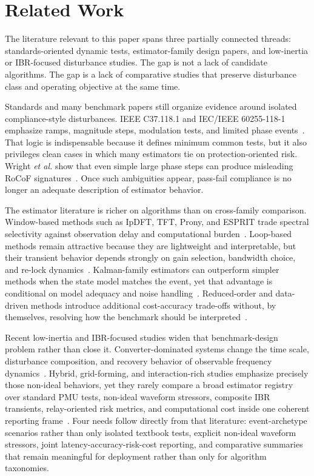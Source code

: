 \section{Related Work}
\label{sec:related_work}

The literature relevant to this paper spans three partially connected threads: standards-oriented dynamic tests, estimator-family design papers, and low-inertia or IBR-focused disturbance studies. The gap is not a lack of candidate algorithms. The gap is a lack of comparative studies that preserve disturbance class and operating objective at the same time.

Standards and many benchmark papers still organize evidence around isolated compliance-style disturbances. IEEE C37.118.1 and IEC/IEEE 60255-118-1 emphasize ramps, magnitude steps, modulation tests, and limited phase events~\cite{IEEE_C37_118,IEC_IEEE_60255_118_1_2018}. That logic is indispensable because it defines minimum common tests, but it also privileges clean cases in which many estimators tie on protection-oriented risk. Wright \textit{et al.} show that even simple large phase steps can produce misleading RoCoF signatures~\cite{Wright2019}. Once such ambiguities appear, pass-fail compliance is no longer an adequate description of estimator behavior.

The estimator literature is richer on algorithms than on cross-family comparison. Window-based methods such as IpDFT, TFT, Prony, and ESPRIT trade spectral selectivity against observation delay and computational burden~\cite{Belega2014,PlatasGarza2011}. Loop-based methods remain attractive because they are lightweight and interpretable, but their transient behavior depends strongly on gain selection, bandwidth choice, and re-lock dynamics~\cite{Golestan2017,Wright2019}. Kalman-family estimators can outperform simpler methods when the state model matches the event, yet that advantage is conditional on model adequacy and noise handling~\cite{Ferrero2020EKF,Chamorro2021}. Reduced-order and data-driven methods introduce additional cost-accuracy trade-offs without, by themselves, resolving how the benchmark should be interpreted~\cite{Netto2018KoopmanKF,Ting2022}.

Recent low-inertia and IBR-focused studies widen that benchmark-design problem rather than close it. Converter-dominated systems change the time scale, disturbance composition, and recovery behavior of observable frequency dynamics~\cite{Milano2018LowInertia,Pinheiro2025,Ponce2025}. Hybrid, grid-forming, and interaction-rich studies emphasize precisely those non-ideal behaviors, yet they rarely compare a broad estimator registry over standard PMU tests, non-ideal waveform stressors, composite IBR transients, relay-oriented risk metrics, and computational cost inside one coherent reporting frame~\cite{Bernal2025,Zoghby2024}. Four needs follow directly from that literature: event-archetype scenarios rather than only isolated textbook tests, explicit non-ideal waveform stressors, joint latency-accuracy-risk-cost reporting, and comparative summaries that remain meaningful for deployment rather than only for algorithm taxonomies.

